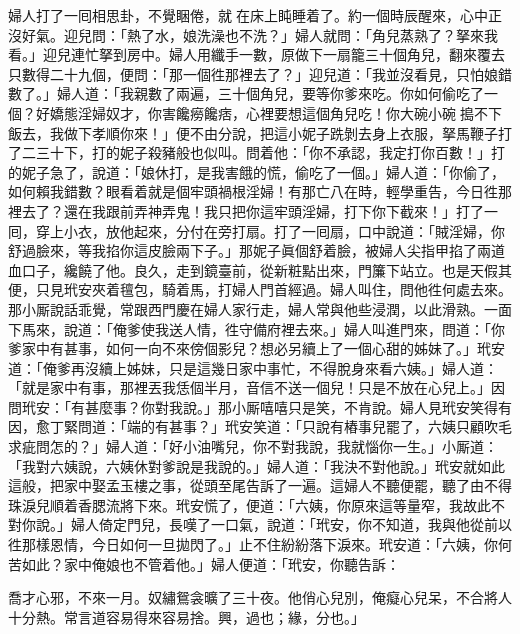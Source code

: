 婦人打了一囘相思卦，不覺睏倦，就𢱉在床上盹睡着了。約一個時辰醒來，心中正沒好氣。{}迎兒問：「熱了水，娘洗澡也不洗？」婦人就問：「角兒蒸熟了？拏來我看。」迎兒連忙拏到房中。婦人用纖手一數，原做下一扇籠三十個角兒，翻來覆去只數得二十九個，便問：「那一個徃那裡去了？」迎兒道：「我並沒看見，只怕娘錯數了。」婦人道：「我親數了兩遍，三十個角兒，要等你爹來吃。你如何偷吃了一個？好嬌態淫婦奴才，{}你害饞癆饞痞，心裡要想這個角兒吃！你大碗小碗𠳹搗不下飯去，我做下孝順你來！」便不由分說，把這小妮子跣剝去身上衣服，拏馬鞭子打了二三十下，打的妮子殺豬般也似叫。問着他：「你不承認，我定打你百數！」打的妮子急了，說道：「娘休打，是我害餓的慌，偷吃了一個。」婦人道：「你偷了，如何賴我錯數？眼看着就是個牢頭禍根淫婦！有那亡八在時，輕學重告，今日徃那裡去了？還在我跟前弄神弄鬼！{}我只把你這牢頭淫婦，打下你下截來！」打了一囘，穿上小衣，放他起來，分付在旁打扇。打了一囘扇，口中說道：「賊淫婦，你舒過臉來，等我掐你這皮臉兩下子。」那妮子眞個舒着臉，被婦人尖指甲掐了兩道血口子，{}纔饒了他。良久，走到鏡臺前，從新粧點出來，門簾下站立。也是天假其便，只見玳安夾着氊包，騎着馬，打婦人門首經過。婦人叫住，問他徃何處去來。那小厮說話乖覺，常跟西門慶在婦人家行走，婦人常與他些浸潤，以此滑熟。一面下馬來，說道：「俺爹使我送人情，徃守備府裡去來。」婦人叫進門來，問道：「你爹家中有甚事，如何一向不來傍個影兒？想必另續上了一個心甜的姊妹了。」玳安道：「俺爹再沒續上姊妹，只是這幾日家中事忙，不得脫身來看六姨。」婦人道：「就是家中有事，那裡丟我恁個半月，音信不送一個兒！只是不放在心兒上。」因問玳安：「有甚麼事？你對我說。」那小厮嘻嘻只是笑，不肯說。{}婦人見玳安笑得有因，愈丁緊問道：「端的有甚事？」玳安笑道：「只說有樁事兒罷了，六姨只顧吹毛求疵問怎的？」婦人道：「好小油嘴兒，你不對我說，我就惱你一生。」{}小厮道：「我對六姨說，六姨休對爹說是我說的。」婦人道：「我決不對他說。」玳安就如此這般，把家中娶孟玉樓之事，從頭至尾告訴了一遍。這婦人不聽便罷，聽了由不得珠淚兒順着香腮流將下來。玳安慌了，便道：「六姨，你原來這等量窄，我故此不對你說。」婦人倚定門兒，長嘆了一口氣，說道：「玳安，你不知道，我與他從前以徃那樣恩情，今日如何一旦拋閃了。」止不住紛紛落下淚來。玳安道：「六姨，你何苦如此？家中俺娘也不管着他。」婦人便道：「玳安，你聽告訴：

\begin{myquote} 
喬才心邪，不來一月。奴繡鴛衾曠了三十夜。他俏心兒別，俺癡心兒呆，不合將人十分熱。常言道容易得來容易捨。興，過也；緣，分也。」
\end{myquote} 

